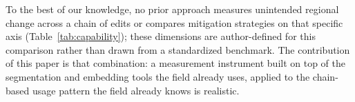To the best of our knowledge, no prior approach measures unintended regional change across a chain of edits or compares mitigation strategies on that specific axis (Table~\ref{tab:capability}); these dimensions are author-defined for this comparison rather than drawn from a standardized benchmark. The contribution of this paper is that combination: a measurement instrument built on top of the segmentation and embedding tools the field already uses, applied to the chain-based usage pattern the field already knows is realistic.
